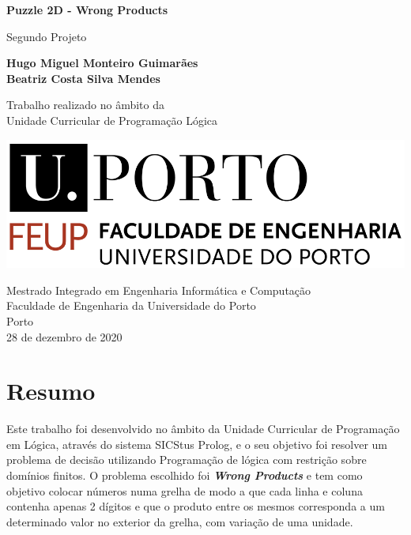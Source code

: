 \documentclass[11pt]{article}
\begin{document}
\begin{titlepage}
	\begin{center}
		\vspace*{1cm}
		
		\Large
		\textbf{Puzzle 2D - Wrong Products}
		
		\vspace{0.5cm}
		\large
		Segundo Projeto
		
		\vspace{1.5cm}
		
		\textbf{Hugo Miguel Monteiro Guimarães}\\
		\textbf{Beatriz Costa Silva Mendes}
		
		\vspace{5cm}
		
		Trabalho realizado no âmbito da\\
		Unidade Curricular de Programação Lógica
		
		\vspace{0.8cm}
	
		\includegraphics[width=0.4 \textwidth]{feup_logo.png}
		
		\vspace{1.5cm}		
		
		\large
		Mestrado Integrado em Engenharia Informática e Computação\\
		Faculdade de Engenharia da Universidade do Porto\\
		Porto\\
		28	 de dezembro de 2020
	
	\end{center}
\end{titlepage}


\pagebreak
\tableofcontents

\pagebreak


\section{Resumo} 
Este trabalho foi desenvolvido no âmbito da Unidade Curricular de Programação em Lógica, através do sistema SICStus Prolog, e o seu objetivo foi resolver um problema de decisão utilizando Programação de lógica com restrição sobre domínios finitos. O problema escolhido foi \textbf{\emph{Wrong Products}} e tem como objetivo colocar números numa grelha de modo a que cada linha e coluna contenha apenas 2 dígitos e que o produto entre os mesmos corresponda a um determinado valor no exterior da grelha, com variação de uma unidade.
\end{document}
